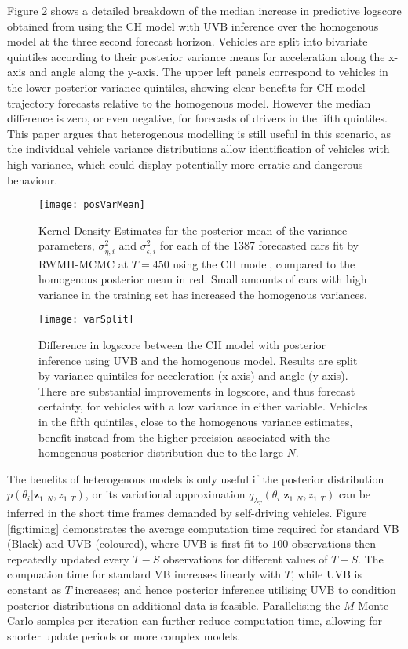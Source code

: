 \documentclass[12pt,a4paper]{article}\usepackage[]{graphicx}\usepackage[]{color}
\begin{document}
Figure \ref{fig:varSplit} shows a detailed breakdown of the median increase in predictive logscore obtained from using the CH model with UVB inference over the homogenous model at the three second forecast horizon. Vehicles are split into bivariate quintiles according to their posterior variance means for acceleration along the x-axis and angle along the y-axis. The upper left panels correspond to vehicles in the lower posterior variance quintiles, showing clear benefits for CH model trajectory forecasts relative to the homogenous model. However the median difference is zero, or even negative, for forecasts of drivers in the fifth quintiles. This paper argues that heterogenous modelling is still useful in this scenario, as the individual vehicle variance distributions allow identification of vehicles with high variance, which could display potentially more erratic and dangerous behaviour.
\\


\begin{figure}[ht]
\centering
\texttt{[image: posVarMean]}
\caption{Kernel Density Estimates for the posterior mean of the variance parameters, $\sigma^2_{\eta, i}$ and $\sigma^2_{\epsilon, i}$ for each of the 1387 forecasted cars fit by RWMH-MCMC at $T = 450$ using the CH model, compared to the homogenous posterior mean in red. Small amounts of cars with high variance in the training set has increased the homogenous variances.}
\label{fig:posVarMean}
\end{figure}

\begin{figure}[ht]
\centering
\texttt{[image: varSplit]}
\caption{Difference in logscore between the CH model with posterior inference using UVB and the homogenous model. Results are split by variance quintiles for acceleration (x-axis) and angle (y-axis). There are substantial improvements in logscore, and thus forecast certainty, for vehicles with a low variance in either variable. Vehicles in the fifth quintiles, close to the homogenous variance estimates, benefit instead from the higher precision associated with the homogenous posterior distribution due to the large $N$.}
\label{fig:varSplit}
\end{figure}

The benefits of heterogenous models is only useful if the posterior distribution $p(\theta_{i} | \textbf{z}_{1:N}, z_{1:T})$, or its variational approximation $q_{\lambda_T}(\theta_{i} | \textbf{z}_{1:N}, z_{1:T})$ can be inferred in the short time frames demanded by self-driving vehicles. Figure \ref{fig:timing} demonstrates the average computation time required for standard VB (Black) and UVB (coloured), where UVB is first fit to $100$ observations then repeatedly updated every $T-S$ observations for different values of $T-S$. The compuation time for standard VB increases linearly with $T$, while UVB is constant as $T$ increases; and hence posterior inference utilising UVB to condition posterior distributions on additional data is feasible. Parallelising the $M$ Monte-Carlo samples per iteration can further reduce computation time, allowing for shorter update periods or more complex models. 
\\ 
\end{document}
